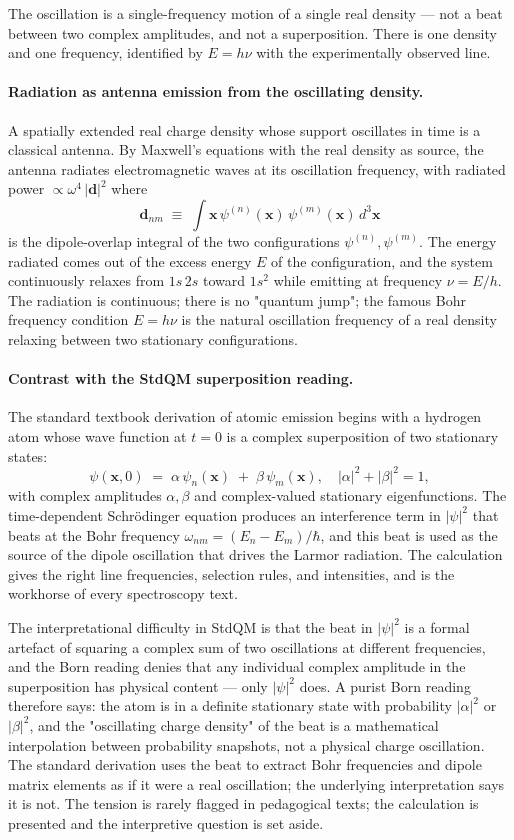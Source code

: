 The oscillation is a single-frequency motion of a single real density --- not a beat between two complex amplitudes, and not a superposition. There is one density and one frequency, identified by $E = h\nu$ with the experimentally observed line.

\paragraph{Radiation as antenna emission from the oscillating density.}
A spatially extended real charge density whose support oscillates in time is a classical antenna. By Maxwell's equations with the real density as source, the antenna radiates electromagnetic waves at its oscillation frequency, with radiated power $\propto \omega^4\, |\mathbf{d}|^2$ where
\[
\mathbf{d}_{nm} \;\equiv\; \int \mathbf{x}\, \psi^{(n)}(\mathbf{x})\, \psi^{(m)}(\mathbf{x})\, d^3\mathbf{x}
\]
is the dipole-overlap integral of the two configurations $\psi^{(n)}, \psi^{(m)}$. The energy radiated comes out of the excess energy $E$ of the configuration, and the system continuously relaxes from $1s\,2s$ toward $1s^2$ while emitting at frequency $\nu = E/h$. The radiation is continuous; there is no "quantum jump"; the famous Bohr frequency condition $E = h\nu$ is the natural oscillation frequency of a real density relaxing between two stationary configurations.

\paragraph{Contrast with the StdQM superposition reading.}
The standard textbook derivation of atomic emission begins with a hydrogen atom whose wave function at $t = 0$ is a complex superposition of two stationary states:
\[
\psi(\mathbf{x}, 0) \;=\; \alpha\, \psi_n(\mathbf{x}) \;+\; \beta\, \psi_m(\mathbf{x}),
\quad |\alpha|^2 + |\beta|^2 = 1,
\]
with complex amplitudes $\alpha, \beta$ and complex-valued stationary eigenfunctions. The time-dependent Schr\"odinger equation produces an interference term in $|\psi|^2$ that beats at the Bohr frequency $\omega_{nm} = (E_n - E_m)/\hbar$, and this beat is used as the source of the dipole oscillation that drives the Larmor radiation. The calculation gives the right line frequencies, selection rules, and intensities, and is the workhorse of every spectroscopy text.

The interpretational difficulty in StdQM is that the beat in $|\psi|^2$ is a formal artefact of squaring a complex sum of two oscillations at different frequencies, and the Born reading denies that any individual complex amplitude in the superposition has physical content --- only $|\psi|^2$ does. A purist Born reading therefore says: the atom is in a definite stationary state with probability $|\alpha|^2$ or $|\beta|^2$, and the "oscillating charge density" of the beat is a mathematical interpolation between probability snapshots, not a physical charge oscillation. The standard derivation uses the beat to extract Bohr frequencies and dipole matrix elements as if it were a real oscillation; the underlying interpretation says it is not. The tension is rarely flagged in pedagogical texts; the calculation is presented and the interpretive question is set aside.

